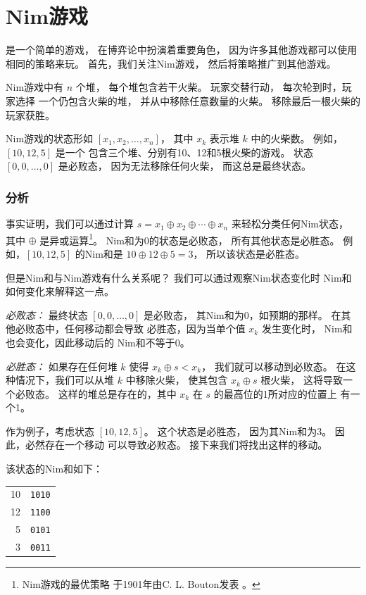 \section{Nim游戏}


是一个简单的游戏，
在博弈论中扮演着重要角色，
因为许多其他游戏都可以使用
相同的策略来玩。
首先，我们关注Nim游戏，
然后将策略推广到其他游戏。

Nim游戏中有 $n$ 个堆，
每个堆包含若干火柴。
玩家交替行动，
每次轮到时，玩家选择
一个仍包含火柴的堆，
并从中移除任意数量的火柴。
移除最后一根火柴的玩家获胜。

Nim游戏的状态形如
$[x_1,x_2,\ldots,x_n]$，
其中 $x_k$ 表示堆 $k$ 中的火柴数。
例如，$[10,12,5]$ 是一个
包含三个堆、分别有10、12和5根火柴的游戏。
状态 $[0,0,\ldots,0]$ 是必败态，
因为无法移除任何火柴，
而这总是最终状态。

\subsubsection{分析}

事实证明，我们可以通过计算
 $s = x_1 \oplus x_2 \oplus \cdots \oplus x_n$
来轻松分类任何Nim状态，
其中 $\oplus$ 是异或运算\footnote{Nim游戏的最优策略
于1901年由C. L. Bouton发表 \cite{bou01}。}。
Nim和为0的状态是必败态，
所有其他状态是必胜态。
例如，$[10,12,5]$ 的Nim和是
$10 \oplus 12 \oplus 5 = 3$，
所以该状态是必胜态。

但是Nim和与Nim游戏有什么关系呢？
我们可以通过观察Nim状态变化时
Nim和如何变化来解释这一点。

\textit{必败态：}
最终状态 $[0,0,\ldots,0]$ 是必败态，
其Nim和为0，如预期的那样。
在其他必败态中，任何移动都会导致
必胜态，因为当单个值 $x_k$ 发生变化时，
Nim和也会变化，因此移动后的
Nim和不等于0。

\textit{必胜态：}
如果存在任何堆 $k$ 使得 $x_k \oplus s < x_k$，
我们就可以移动到必败态。
在这种情况下，我们可以从堆 $k$ 中移除火柴，
使其包含 $x_k \oplus s$ 根火柴，
这将导致一个必败态。
这样的堆总是存在的，其中 $x_k$
在 $s$ 的最高位的1所对应的位置上
有一个1。

作为例子，考虑状态 $[10,12,5]$。
这个状态是必胜态，
因为其Nim和为3。
因此，必然存在一个移动
可以导致必败态。
接下来我们将找出这样的移动。

该状态的Nim和如下：

\begin{center}
\begin{tabular}{r|r}
10 & \texttt{1010} \\
12 & \texttt{1100} \\
5 & \texttt{0101} \\
\hline
3 & \texttt{0011} \\
\end{tabular}
\end{center}

